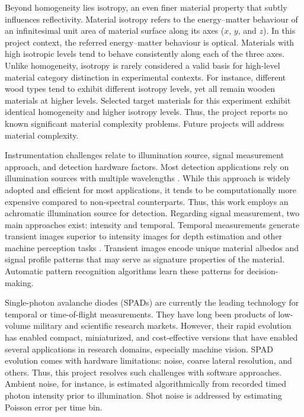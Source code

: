 \documentclass[12pt,a4paper,oneside]{report}
\begin{document}
Beyond homogeneity lies isotropy, an even finer material property that subtly influences reflectivity. Material isotropy refers to the energy--matter behaviour of an infinitesimal unit area of material surface along its axes ($x$, $y$, and $z$). In this project context, the referred energy--matter behaviour is optical. Materials with high isotropic levels tend to behave consistently along each of the three axes. Unlike homogeneity, isotropy is rarely considered a valid basis for high-level material category distinction in experimental contexts. For instance, different wood types tend to exhibit different isotropy levels, yet all remain wooden materials at higher levels. Selected target materials for this experiment exhibit identical homogeneity and higher isotropy levels. Thus, the project reports no known significant material complexity problems. Future projects will address material complexity.

Instrumentation challenges relate to illumination source, signal measurement approach, and detection hardware factors. Most detection applications rely on illumination sources with multiple wavelengths \cite{su2016}. While this approach is widely adopted and efficient for most applications, it tends to be computationally more expensive compared to non-spectral counterparts. Thus, this work employs an achromatic illumination source for detection. Regarding signal measurement, two main approaches exist: intensity and temporal. Temporal measurements generate transient images superior to intensity images for depth estimation and other machine perception tasks \cite{su2016}. Transient images encode unique material albedos \cite{jungerman2022} and signal profile patterns that may serve as signature properties of the material. Automatic pattern recognition algorithms learn these patterns for decision-making.

Single-photon avalanche diodes (SPADs) are currently the leading technology for temporal or time-of-flight measurements. They have long been products of low-volume military and scientific research markets. However, their rapid evolution has enabled compact, miniaturized, and cost-effective versions \cite{vl53l5cx2022} that have enabled several applications in research domains, especially machine vision. SPAD evolution comes with hardware limitations: noise, coarse lateral resolution, and others. Thus, this project resolves such challenges with software approaches. Ambient noise, for instance, is estimated algorithmically from recorded timed photon intensity prior to illumination. Shot noise is addressed by estimating Poisson error per time bin.
\end{document}
